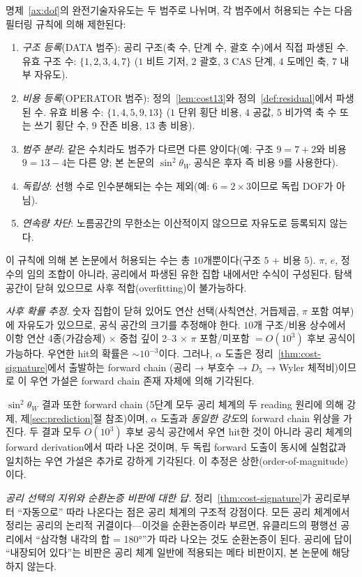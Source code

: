 \documentclass[entropy,article,submit,pdftex,oneauthor]{Definitions/mdpi}
\begin{document}
명제~\ref{ax:dof}의 완전기술자유도는 두 범주로 나뉘며, 각 범주에서 허용되는 수는 다음 필터링 규칙에 의해 제한된다:
\begin{enumerate}
\item \emph{구조 등록}(DATA 범주): 공리 구조(축 수, 단계 수, 괄호 수)에서 직접 파생된 수. 유효 구조 수: $\{1, 2, 3, 4, 7\}$ ($1$ 비트 기저, $2$ 괄호, $3$ CAS 단계, $4$ 도메인 축, $7$ 내부 자유도).
\item \emph{비용 등록}(OPERATOR 범주): 정의~\ref{lem:cost13}와 정의~\ref{def:residual}에서 파생된 수. 유효 비용 수: $\{1, 4, 5, 9, 13\}$ ($1$ 단위 횡단 비용, $4$ 공값, $5$ 비가역 축 수 또는 쓰기 횡단 수, $9$ 잔존 비용, $13$ 총 비용).
\item \emph{범주 분리}: 같은 수치라도 범주가 다르면 다른 양이다(예: 구조 $9 = 7+2$와 비용 $9 = 13-4$는 다른 양; 본 논문의 $\sin^2\theta_W$ 공식은 후자 즉 비용 $9$를 사용한다).
\item \emph{독립성}: 선행 수로 인수분해되는 수는 제외(예: $6 = 2 \times 3$이므로 독립 DOF가 아님).
\item \emph{연속량 차단}: 노름공간의 무한소는 이산적이지 않으므로 자유도로 등록되지 않는다.
\end{enumerate}

이 규칙에 의해 본 논문에서 허용되는 수는 총 $10$개뿐이다(구조 $5$ + 비용 $5$). $\pi$, $e$, 정수의 임의 조합이 아니라, 공리에서 파생된 유한 집합 내에서만 수식이 구성된다. 탐색 공간이 닫혀 있으므로 사후 적합(overfitting)이 불가능하다.

\emph{사후 확률 추정}. 숫자 집합이 닫혀 있어도 연산 선택(사칙연산, 거듭제곱, $\pi$ 포함 여부)에 자유도가 있으므로, 공식 공간의 크기를 추정해야 한다. $10$개 구조/비용 상수에서 이항 연산 4종(가감승제) $\times$ 중첩 깊이 2--3 $\times$ $\pi$ 포함/미포함 $= O(10^3)$ 후보 공식이 가능하다. 우연한 hit의 확률은 $\sim 10^{-3}$이다. 그러나, $\alpha$ 도출은 정리~\ref{thm:cost-signature}에서 출발하는 forward chain (공리 → 부호수 → $D_5$ → Wyler 체적비)이므로 이 우연 가설은 forward chain 존재 자체에 의해 기각된다.

$\sin^2\theta_W$ 결과 또한 forward chain (5단계 모두 공리 체계의 두 reading 원리에 의해 강제, 제\ref{sec:prediction}절 참조)이며, $\alpha$ 도출과 \emph{동일한 강도}의 forward chain 위상을 가진다. 두 결과 모두 $O(10^3)$ 후보 공식 공간에서 우연 hit한 것이 아니라 공리 체계의 forward derivation에서 따라 나온 것이며, 두 독립 forward 도출이 동시에 실험값과 일치하는 우연 가설은 추가로 강하게 기각된다. 이 추정은 상한(order-of-magnitude)이다.

\emph{공리 선택의 지위와 순환논증 비판에 대한 답.} 정리~\ref{thm:cost-signature}가 공리로부터 ``자동으로'' 따라 나온다는 점은 공리 체계의 구조적 강점이다. 모든 공리 체계에서 정리는 공리의 논리적 귀결이다---이것을 순환논증이라 부르면, 유클리드의 평행선 공리에서 ``삼각형 내각의 합 = 180°''가 따라 나오는 것도 순환논증이 된다. 공리에 답이 ``내장되어 있다''는 비판은 공리 체계 일반에 적용되는 메타 비판이지, 본 논문에 해당하지 않는다.
\end{document}
